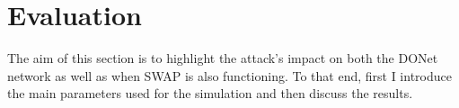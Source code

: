 \section{Evaluation}
\label{sec:eval}

The aim of this section is to highlight the attack's impact on both the DONet network as well as when SWAP is also functioning. 
To that end, first I introduce the main parameters used for the simulation and then discuss the results.

% 
% 
%  
% 
